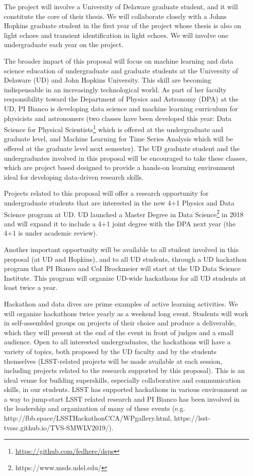 The project will involve a University of Delaware graduate student, and it will constitute the core of their thesis.  We will collaborate closely with a Johns Hopkins graduate student in the first year of the project whose thesis is also on light echoes and transient identification in light echoes.  We will involve one undergraduate each year on the project. 

The broader impact of this proposal will focus on machine learning and data science education of undergraduate and graduate students at the University of Delaware (UD) and John Hopkins University. 
This skill are becoming indispensable in an increasingly technological world.  As part of her faculty responsibility toward the Department of Physics and Astronomy (DPA) at the UD, PI Bianco is developing data science and machine learning curriculum for physicists and astronomers (two classes have been developed this year: Data Science for Physical Scientists\footnote{\url{https://github.com/fedhere/dsps}} which is offered at the undergraduate and graduate level, and Machine Learning for Time Series Analysis which will be offered at the graduate level next semester). 
The UD graduate student and the undergraduates involved in this proposal will be encouraged to take these classes, which are project based designed to provide a hands-on learning environment ideal for developing data-driven research skills. 

Projects related to this proposal will offer a research opportunity for undergraduate students that are interested in the new 4+1 Physics and Data Science program at UD. UD launched a Master Degree in Data Science\footnote{https://www.msds.udel.edu/} in 2018 and will expand it to include a 4+1 joint degree with the DPA next year (the 4+1 is under academic review).

Another important opportunity  will be available to all student involved in this proposal (at UD and Hopkins), and to all UD students, through a UD hackathon program that PI Bianco and CoI Brockmeier will start at the UD Data Science Institute.  This program will organize UD-wide hackathons for all UD students at least twice a year.

Hackathon and data dives are prime examples of active learning activities.  We will organize hackathons twice yearly as a weekend long event.  Students will work in self-assembled groups on projects of their choice and produce a deliverable, which they will present at the end of the event in front of judges and a small audience.  Open to all interested undergraduates, the hackathons will have a variety of topics, both proposed by the UD faculty and by the students themselves (LSST-related projects will be made available at each session, including projects related to the research supported by this proposal). This is an ideal venue for building superskills, especially collaborative and communication skills, in our students. LSST has supported hackathons in various environment as a way to jump-start LSST related research and PI Bianco has been involved in the leadership and organization of many of these events (e.g. http://fbb.space/LSSTHackathonCCA/WPgallery.html, https://lsst-tvssc.github.io/TVS-SMWLV2019/).

